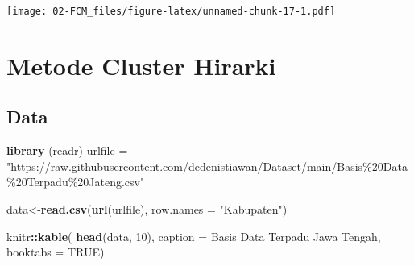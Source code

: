 \documentclass[
]{elegantbook}
\newenvironment{Shaded}{\begin{snugshade}}{\end{snugshade}}
\newcommand{\AttributeTok}[1]{\textcolor[rgb]{0.13,0.29,0.53}{#1}}
\newcommand{\ConstantTok}[1]{\textcolor[rgb]{0.56,0.35,0.01}{#1}}
\newcommand{\DecValTok}[1]{\textcolor[rgb]{0.00,0.00,0.81}{#1}}
\newcommand{\FunctionTok}[1]{\textcolor[rgb]{0.13,0.29,0.53}{\textbf{#1}}}
\newcommand{\NormalTok}[1]{#1}
\newcommand{\OtherTok}[1]{\textcolor[rgb]{0.56,0.35,0.01}{#1}}
\newcommand{\SpecialCharTok}[1]{\textcolor[rgb]{0.81,0.36,0.00}{\textbf{#1}}}
\newcommand{\StringTok}[1]{\textcolor[rgb]{0.31,0.60,0.02}{#1}}
\begin{document}
\texttt{[image: 02-FCM\_files/figure-latex/unnamed-chunk-17-1.pdf]}

\hypertarget{metode-cluster-hirarki}{%
\chapter{Metode Cluster Hirarki}\label{metode-cluster-hirarki}}

\hypertarget{data-2}{%
\section{Data}\label{data-2}}

\begin{Shaded}
\begin{Highlighting}[]
\FunctionTok{library}\NormalTok{ (readr)}
\NormalTok{urlfile }\OtherTok{=} \StringTok{"https://raw.githubusercontent.com/dedenistiawan/Dataset/main/Basis\%20Data\%20Terpadu\%20Jateng.csv"}

\NormalTok{data}\OtherTok{\textless{}{-}}\FunctionTok{read.csv}\NormalTok{(}\FunctionTok{url}\NormalTok{(urlfile), }\AttributeTok{row.names =} \StringTok{"Kabupaten"}\NormalTok{)}
\end{Highlighting}
\end{Shaded}

\begin{Shaded}
\begin{Highlighting}[]
\NormalTok{knitr}\SpecialCharTok{::}\FunctionTok{kable}\NormalTok{(}
  \FunctionTok{head}\NormalTok{(data, }\DecValTok{10}\NormalTok{), }\AttributeTok{caption =} \StringTok{\textquotesingle{}Basis Data Terpadu Jawa Tengah\textquotesingle{}}\NormalTok{,}
  \AttributeTok{booktabs =} \ConstantTok{TRUE}\NormalTok{)}
\end{Highlighting}
\end{Shaded}
\end{document}
